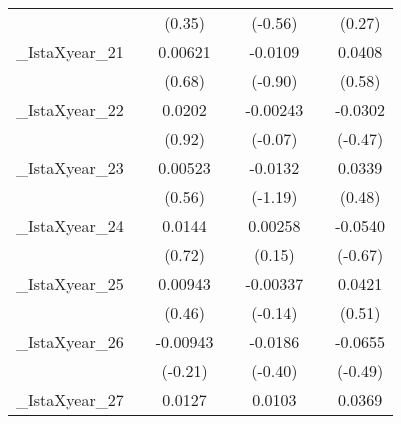 {\begin{tabular}{l*{6}{c}}
            &                     &      (0.35)         &                     &     (-0.56)         &                     &      (0.27)         \\
[1em]
\_IstaXyear\_21&                     &     0.00621         &                     &     -0.0109         &                     &      0.0408         \\
            &                     &      (0.68)         &                     &     (-0.90)         &                     &      (0.58)         \\
[1em]
\_IstaXyear\_22&                     &      0.0202         &                     &    -0.00243         &                     &     -0.0302         \\
            &                     &      (0.92)         &                     &     (-0.07)         &                     &     (-0.47)         \\
[1em]
\_IstaXyear\_23&                     &     0.00523         &                     &     -0.0132         &                     &      0.0339         \\
            &                     &      (0.56)         &                     &     (-1.19)         &                     &      (0.48)         \\
[1em]
\_IstaXyear\_24&                     &      0.0144         &                     &     0.00258         &                     &     -0.0540         \\
            &                     &      (0.72)         &                     &      (0.15)         &                     &     (-0.67)         \\
[1em]
\_IstaXyear\_25&                     &     0.00943         &                     &    -0.00337         &                     &      0.0421         \\
            &                     &      (0.46)         &                     &     (-0.14)         &                     &      (0.51)         \\
[1em]
\_IstaXyear\_26&                     &    -0.00943         &                     &     -0.0186         &                     &     -0.0655         \\
            &                     &     (-0.21)         &                     &     (-0.40)         &                     &     (-0.49)         \\
[1em]
\_IstaXyear\_27&                     &      0.0127         &                     &      0.0103         &                     &      0.0369         \\

\end{tabular}}

